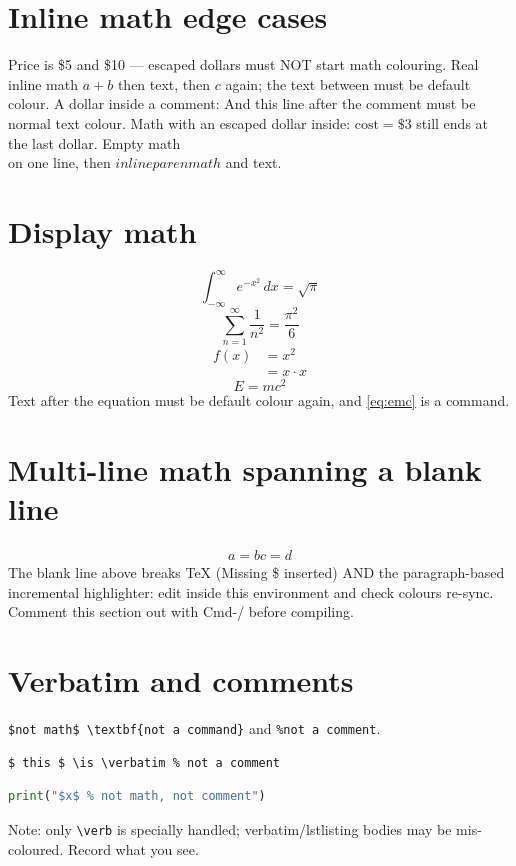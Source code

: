 \documentclass{article}
\begin{document}
\section{Inline math edge cases}
Price is \$5 and \$10 --- escaped dollars must NOT start math colouring.
Real inline math $a + b$ then text, then $c$ again; the text between must be default colour.
A dollar inside a comment: %
And this line after the comment must be normal text colour.
Math with an escaped dollar inside: $\text{cost} = \$3$ still ends at the last dollar.
Empty math $$ $$ on one line, then \( inline paren math \) and text.

\section{Display math}
\[
  \int_{-\infty}^{\infty} e^{-x^2}\,dx = \sqrt{\pi}
\]
$$ \sum_{n=1}^\infty \frac{1}{n^2} = \frac{\pi^2}{6} $$
\begin{align*}
  f(x) &= x^2 \\
       &= x \cdot x %
\end{align*}
\begin{equation}
  E = mc^2 \label{eq:emc}
\end{equation}
Text after the equation must be default colour again, and \eqref{eq:emc} is a command.

\section{Multi-line math spanning a blank line}
\begin{gather}
  a = b

  c = d
\end{gather}
The blank line above breaks TeX (Missing \$ inserted) AND the paragraph-based
incremental highlighter: edit inside this environment and check colours re-sync.
Comment this section out with Cmd-/ before compiling.

\section{Verbatim and comments}
\verb|$not math$ \textbf{not a command}| and \verb+%not a comment+.
\begin{verbatim}
$ this $ \is \verbatim % not a comment
\end{verbatim}
\begin{lstlisting}[language=Python]
print("$x$ % not math, not comment")
\end{lstlisting}
Note: only \verb|\verb| is specially handled; verbatim/lstlisting bodies may be
mis-coloured. Record what you see.
\end{document}
